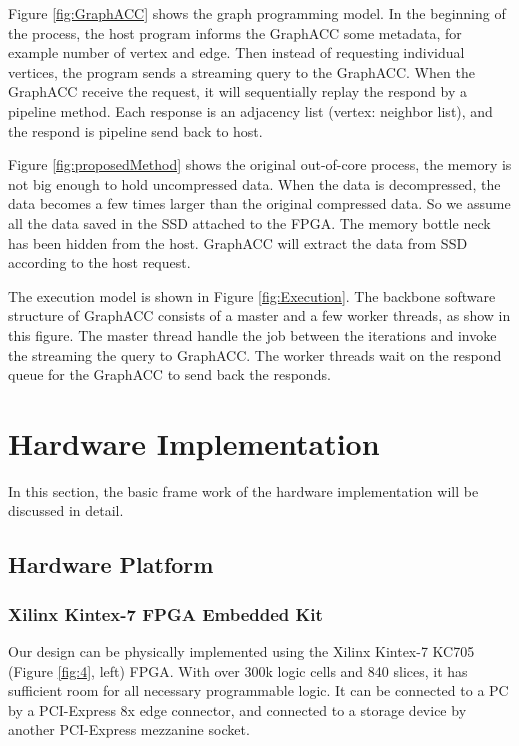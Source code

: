 Figure \ref{fig:GraphACC} shows the graph programming model. In the beginning of the process, the host program informs the GraphACC some metadata, for example number of vertex and edge. Then instead of requesting individual vertices, the program sends a streaming query to the GraphACC. When the GraphACC receive the request, it will sequentially replay the respond by a pipeline method. Each response is an adjacency list (vertex: {neighbor list}), and the respond is pipeline send back to host.



Figure \ref{fig:proposedMethod} shows the original out-of-core process, the memory is not big enough to hold uncompressed data. When the data is decompressed, the data becomes a few times larger than the original compressed data. So we assume all the data saved in the SSD attached to the FPGA. The memory bottle neck has been hidden from the host. GraphACC will extract the data from SSD according to the host request.  

The execution model is shown in Figure \ref{fig:Execution}. The backbone software structure of GraphACC consists of a master and a few worker threads, as show in this figure. The master thread handle the job between the iterations and invoke the streaming the query to GraphACC. The worker threads wait on the respond queue for the GraphACC to send back the responds. 



\section{Hardware Implementation}
In this section, the basic frame work of the hardware implementation will be discussed in detail. 


\subsection{Hardware Platform}

\subsubsection{Xilinx Kintex-7 FPGA Embedded Kit}
Our design can be physically implemented using the Xilinx Kintex-7 KC705 (Figure \ref{fig:4}, left) FPGA.  With over 300k logic cells and 840 slices, it has sufficient room for all necessary programmable logic.  It can be connected to a PC by a PCI-Express 8x edge connector, and connected to a storage device by another PCI-Express mezzanine socket.


